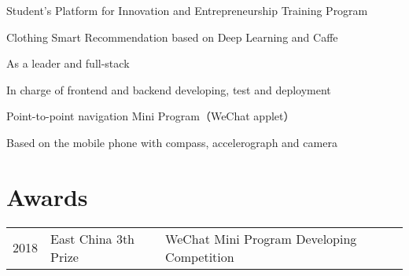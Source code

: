 \documentclass[]{deedy-resume-openfont}
\begin{document}
\begin{minipage}[t]{0.73\textwidth}
\begin{tightemize}
    \item Student's Platform for Innovation and Entrepreneurship Training Program
    \item Clothing Smart Recommendation based on Deep Learning and Caffe
\end{tightemize}

\sectionsep

\begin{tightemize}
    \item As a leader and full-stack
    \item In charge of frontend and backend developing, test and deployment
    \item Point-to-point navigation Mini Program（WeChat applet）
    \item Based on the mobile phone with compass, accelerograph and camera
\end{tightemize}
\sectionsep




\section{Awards} 
\begin{tabular}{rll}
2018         & East China 3th Prize  & WeChat Mini Program Developing Competition \\
\end{tabular}
\sectionsep


% 
% 

\end{minipage} 
\end{document}
